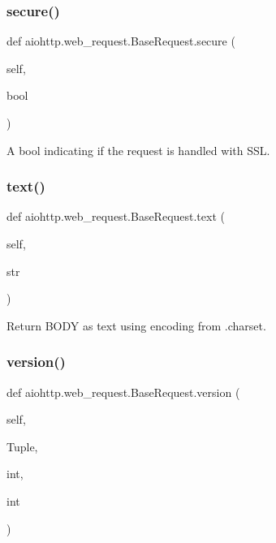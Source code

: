 \subsubsection{\texorpdfstring{secure()}{secure()}}
{\footnotesize\ttfamily def aiohttp.\+web\+\_\+request.\+Base\+Request.\+secure (\begin{DoxyParamCaption}\item[{}]{self,  }\item[{}]{bool }\end{DoxyParamCaption})}

\begin{DoxyVerb}A bool indicating if the request is handled with SSL.\end{DoxyVerb}
 \mbox{\label{classaiohttp_1_1web__request_1_1_base_request_a5e249e78e11ee554c9f3396849e6b46d}} 
\subsubsection{\texorpdfstring{text()}{text()}}
{\footnotesize\ttfamily def aiohttp.\+web\+\_\+request.\+Base\+Request.\+text (\begin{DoxyParamCaption}\item[{}]{self,  }\item[{}]{str }\end{DoxyParamCaption})}

\begin{DoxyVerb}Return BODY as text using encoding from .charset.\end{DoxyVerb}
 \mbox{\label{classaiohttp_1_1web__request_1_1_base_request_a7b56275ca145c329cdef36ce4503214f}} 
\subsubsection{\texorpdfstring{version()}{version()}}
{\footnotesize\ttfamily def aiohttp.\+web\+\_\+request.\+Base\+Request.\+version (\begin{DoxyParamCaption}\item[{}]{self,  }\item[{}]{Tuple,  }\item[{}]{int,  }\item[{}]{int }\end{DoxyParamCaption})}


